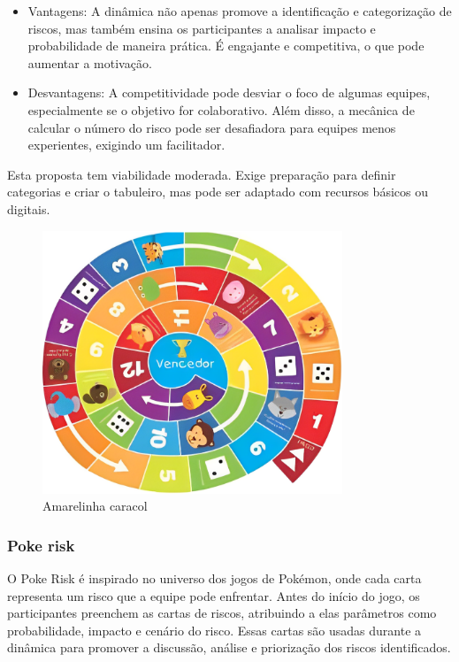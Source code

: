\documentclass[
	12pt,
	openright,
	twoside,
	a4paper,
	english,
	brazil
	]{abntex2}
\begin{document}
\begin{itemize}
  \item Vantagens: A dinâmica não apenas promove a identificação e categorização de riscos, mas também ensina os participantes a analisar impacto e probabilidade de maneira prática. É engajante e competitiva, o que pode aumentar a motivação.
  \item Desvantagens: A competitividade pode desviar o foco de algumas equipes, especialmente se o objetivo for colaborativo. Além disso, a mecânica de calcular o número do risco pode ser desafiadora para equipes menos experientes, exigindo um facilitador.
\end{itemize}

Esta proposta tem viabilidade moderada. Exige preparação para definir categorias e criar o tabuleiro, mas pode ser adaptado com recursos básicos ou digitais.

\begin{figure}[H]
  \centering
  \caption{\label{amarelinha}Amarelinha caracol}
  \includegraphics[width=0.8\textwidth]{amarelinha}
\end{figure}

\subsubsection{Poke risk}

O Poke Risk é inspirado no universo dos jogos de Pokémon, onde cada carta representa um risco que a equipe pode enfrentar. Antes do início do jogo, os participantes preenchem as cartas de riscos, atribuindo a elas parâmetros como probabilidade, impacto e cenário do risco. Essas cartas são usadas durante a dinâmica para promover a discussão, análise e priorização dos riscos identificados.
\end{document}
